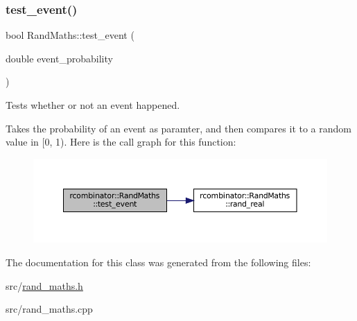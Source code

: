 \subsubsection{\texorpdfstring{test\+\_\+event()}{test\_event()}}
{\footnotesize\ttfamily bool Rand\+Maths\+::test\+\_\+event (\begin{DoxyParamCaption}\item[{double}]{event\+\_\+probability }\end{DoxyParamCaption})\hspace{0.3cm}{\ttfamily [inline]}}



Tests whether or not an event happened. 

Takes the probability of an event as paramter, and then compares it to a random value in \mbox{[}0, 1). Here is the call graph for this function\+:
\nopagebreak
\begin{figure}[H]
\begin{center}
\leavevmode
\includegraphics[width=350pt]{classrcombinator_1_1RandMaths_a183686140a9da18ad40c7e048ee8914e_cgraph}
\end{center}
\end{figure}


The documentation for this class was generated from the following files\+:\begin{DoxyCompactItemize}
\item 
src/\mbox{\hyperlink{rand__maths_8h}{rand\+\_\+maths.\+h}}\item 
src/rand\+\_\+maths.\+cpp\end{DoxyCompactItemize}
